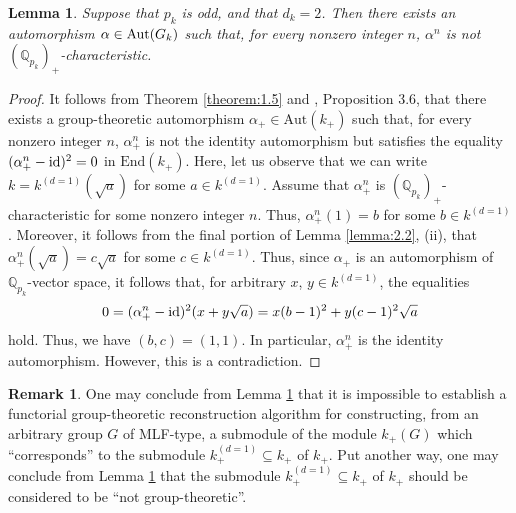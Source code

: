 \documentclass[12pt,showkeys]{amsart}
\theoremstyle{theorem}
\newtheorem{lem}[theorem]{Lemma}
\theoremstyle{definition}
\newtheorem{remark}[theorem]{Remark}
\def\bQ{{\mathbb Q}}
\def\End{{\mbox{End}}}
\def\Aut{{\mbox{Aut}}}
\begin{document}
\begin{lem}\label{lemma:2.5}
Suppose that $p_k$ is odd, and that $d_k = 2$. Then there exists an automorphism $\alpha \in {\rm Aut}(G_k)$ such that, for every nonzero integer $n$, $\alpha^n$ is not $(\bQ_{p_k})_{+}$-characteristic. 
\end{lem}
\begin{proof}
It follows from Theorem \ref{theorem:1.5} and \cite{Hoshi1}, Proposition 3.6, that there exists a group-theoretic automorphism $\alpha_{+} \in \Aut(k_+)$ such that, for every nonzero integer $n$, $\alpha_+^n$ is not the identity automorphism but satisfies the equality  $(\alpha^n_{+} -{\rm id})^2 = 0$ in $\End(k_+)$. 
Here, let us observe that we can write $k = k^{(d=1)}(\sqrt{a})$ for some $a \in k^{(d=1)}$. 
Assume that $\alpha^n_+$ is $(\bQ_{p_k})_{+}$-characteristic for some nonzero integer $n$. 
Thus, $\alpha^n_+(1) = b$ for some $b \in k^{(d=1)}$.  Moreover, it follows from the final portion of Lemma \ref{lemma:2.2}, (ii), that $\alpha^n_+(\sqrt{a}) = c\sqrt{a}$ for some $c \in k^{(d=1)}$.  Thus, since $\alpha_+$ is an automorphism of $\bQ_{p_k}$-vector space, it follows that, for arbitrary $x$, $y \in k^{(d=1)}$, the equalities 
\begin{eqnarray}
0 = (\alpha^n_{+} -{\rm id})^2(x+y\sqrt{a}) = x (b - 1)^2 + y (c-1)^2 \sqrt{a}  \nonumber
\end{eqnarray}
hold. Thus, we have $(b, c) = (1, 1)$. 
In particular, $\alpha^n_{+}$ is the identity automorphism. However, this is a contradiction. 
\end{proof}

\begin{remark}\label{remark:2.6}
One may conclude from Lemma \ref{lemma:2.5} that 
it is impossible to establish a functorial group-theoretic 
reconstruction algorithm for constructing, from an arbitrary group 
$G$ of MLF-type, a submodule of the module $k_+(G)$ 
which ``corresponds'' to the submodule $k^{(d=1)}_+ 
\subseteq k_+$ of $k_+$.  Put another way, one may 
conclude from Lemma \ref{lemma:2.5} that the 
submodule $k^{(d=1)}_+ \subseteq k_+$ of $k_+$ should 
be considered to be ``not group-theoretic''.  
\end{remark}
\end{document}
